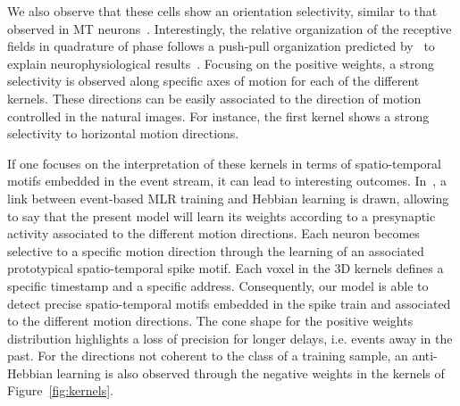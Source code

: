 \documentclass[default]{sn-jnl}%
\theoremstyle{thmstyleone}%
\theoremstyle{thmstyletwo}%
\theoremstyle{thmstylethree}%
\newcommand{\note}[1]{{\sethlcolor{yellow}\hl{#1}}}
\begin{document}
We also observe that these cells show an orientation selectivity, similar to that observed in MT neurons~\citep{deangelis_functional_1999}. Interestingly, the relative organization of the receptive fields in quadrature of phase follows a push-pull organization predicted by~\citet{kremkow_push-pull_2016} to explain neurophysiological results~\citep{baudot_animation_2013}.  
Focusing on the positive weights, a strong selectivity is observed along specific axes of motion for each of the different kernels. These directions can be easily associated to the direction of motion controlled in the natural images. For instance, the first kernel shows a strong selectivity to horizontal motion directions.
%

If one focuses on the interpretation of these kernels in terms of spatio-temporal motifs embedded in the event stream, it can lead to interesting outcomes. In~\citep{grimaldi_robust_2022}, a link between event-based MLR training and Hebbian learning is drawn, allowing to say that the present model will learn its weights according to a presynaptic activity associated to the different motion directions. Each neuron becomes selective to a specific motion direction through the learning of an associated prototypical spatio-temporal spike motif. Each voxel in the 3D kernels defines a specific timestamp and a specific address. Consequently, our model is able to detect precise spatio-temporal motifs embedded in the spike train and associated to the different motion directions. The cone shape for the positive weights distribution highlights a loss of precision for longer delays, i.e. events away in the past. For the directions not coherent to the class of a training sample, an anti-Hebbian learning is also observed through the negative weights in the kernels of Figure~\ref{fig:kernels}. 

%

%
\end{document}

